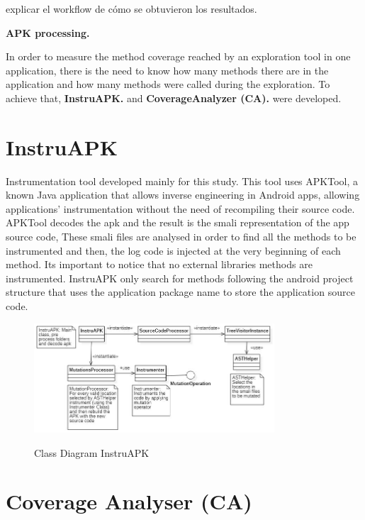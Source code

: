 explicar el workflow de cómo se obtuvieron los resultados.

\textbf{APK processing.} 

In order to measure the method coverage reached by an exploration tool in one application, there is the need to know how many methods there are in the application and how many methods were called during the exploration. To achieve that, \textbf{InstruAPK.} and \textbf{CoverageAnalyzer (CA).} were developed.

\section{InstruAPK}

Instrumentation tool developed mainly for this study. This tool uses APKTool, a known Java application that allows inverse engineering in Android apps, allowing applications' instrumentation without the need of recompiling their source code. APKTool decodes the apk and the result is the smali representation of the app source code, These smali files are analysed in order to find all the methods to be instrumented and then, the log code is injected at the very beginning of each method. Its important to notice that no external libraries methods are instrumented. InstruAPK only search for methods following the android project structure that uses the application package name to store the application source code.

\begin{figure}[h]
\centering
\includegraphics[width=0.8\textwidth]{../Figures/ClassDiagramInstruAPK.jpg}
\label{fig:instruAPK}
\caption{Class Diagram InstruAPK}
\end{figure}

\section{Coverage Analyser (CA)}

